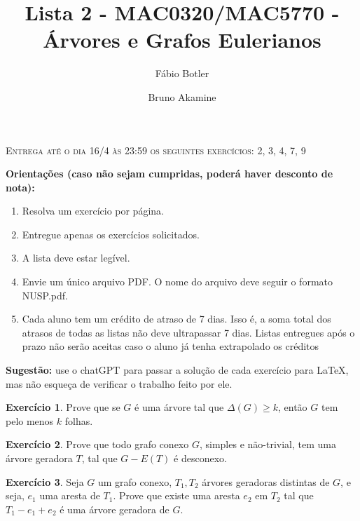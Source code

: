 \documentclass[11pt]{amsart}
\title{Lista 2 - MAC0320/MAC5770 - Árvores e Grafos Eulerianos}
\author{Fábio Botler \and Bruno Akamine}
\theoremstyle{plain}
\theoremstyle{definition}
\newtheorem{exercise}{Exercício}
\begin{document}
\maketitle

\begin{center}
  \begin{tcolorbox}[width=0.65\textwidth,colframe=red,colback=red!20]
    \textsc{Entrega até o dia 16/4 às 23:59 os seguintes exercícios: 2, 3, 4, 7, 9}
  \end{tcolorbox}
\end{center}

\vspace{1cm}

\textbf{Orientações (caso não sejam cumpridas, poderá haver desconto de nota):}
\begin{enumerate}
  \item Resolva um exercício por página.
  \item Entregue apenas os exercícios solicitados.
  \item A lista deve estar legível.
  \item Envie um único arquivo PDF. O nome do arquivo deve seguir o formato NUSP.pdf.
  \item Cada aluno tem um crédito de atraso de 7 dias. Isso é, a soma total dos
    atrasos de todas as listas não deve ultrapassar 7 dias. Listas entregues
    após o prazo não serão aceitas caso o aluno já tenha extrapolado os créditos
\end{enumerate}
\textbf{Sugestão:} use o chatGPT para passar a solução de cada exercício para \LaTeX, mas não esqueça de verificar o trabalho feito por ele.

\vspace{5mm}

\begin{exercise}
  Prove que se $G$ é uma árvore tal que $\Delta(G) \ge k$, então $G$ tem pelo
  menos $k$ folhas.
\end{exercise}

\begin{exercise}
  Prove que todo grafo conexo $G$, simples e não-trivial, tem uma árvore
  geradora $T$, tal que $G-E(T)$ é desconexo.
\end{exercise}

\begin{exercise}
  Seja $G$ um grafo conexo, $T_{1}, T_{2}$ árvores geradoras distintas de $G$, e
  seja, $e_{1}$ uma aresta de $T_{1}$.
  Prove que existe uma aresta $e_{2}$ em $T_{2}$ tal que $T_{1} - e_{1} +
  e_{2}$ é uma árvore geradora de $G$.
\end{exercise}
\end{document}
